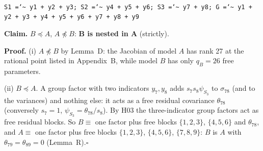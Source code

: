 \documentclass[10pt,a4paper]{article}
\newcommand{\nest}{\preceq}
\newcommand{\nnest}{\not\preceq}
\begin{document}
\begin{minipage}[t]{0.49\textwidth}
\\[1pt]{\scriptsize \texttt{S1 =\char`\~{} y1 + y2 + y3; S2 =\char`\~{} y4 + y5 + y6; S3 =\char`\~{} y7 + y8; G =\char`\~{} y1 + y2 + y3 + y4 + y5 + y6 + y7 + y8 + y9}}\end{minipage}
\par\bigskip
\noindent\textbf{Claim.} $B \nest A$, $A \nnest B$: \textbf{B is nested in A} (strictly).\par\smallskip
\noindent\textbf{Proof.} (i) $A\nnest B$ by Lemma~D: the Jacobian of model $A$ has rank 27 at the rational point listed in Appendix~B, while model $B$ has only $q_B=26$ free parameters.\par\smallskip
\noindent(ii) $B\nest A$. A group factor with two indicators $y_7,y_8$ adds $s_7s_8\psi_{S_3}$ to $\sigma_{78}$ (and to the variances) and nothing else: it acts as a free residual covariance $\theta_{78}$ (conversely $s_7=1$, $\psi_{S_3}=\theta_{78}/s_8$). By H03 the three-indicator group factors act as free residual blocks. So $B\equiv$ one factor plus free blocks $\{1,2,3\}$, $\{4,5,6\}$ and $\theta_{78}$, and $A\equiv$ one factor plus free blocks $\{1,2,3\}$, $\{4,5,6\}$, $\{7,8,9\}$: $B$ is $A$ with $\theta_{79}=\theta_{89}=0$ (Lemma~R).\hfill$\square$\par\medskip
{}

\clearpage
\end{document}
